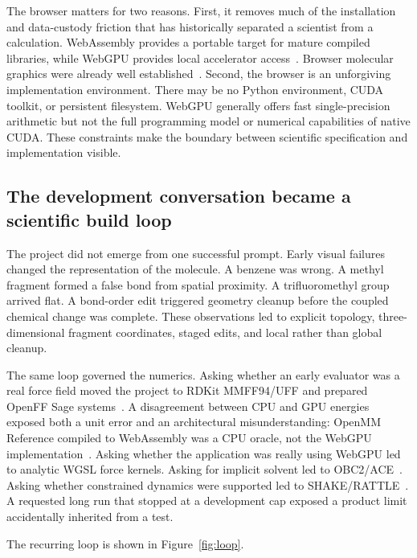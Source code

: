 \documentclass[11pt]{article}
\begin{document}
The browser matters for two reasons.
First, it removes much of the installation and data-custody friction that has historically separated a scientist from a calculation.
WebAssembly provides a portable target for mature compiled libraries, while WebGPU provides local accelerator access~\cite{haas2017wasm,w3c2025webgpu}.
Browser molecular graphics were already well established~\cite{rose2015ngl}.
Second, the browser is an unforgiving implementation environment.
There may be no Python environment, CUDA toolkit, or persistent filesystem.
WebGPU generally offers fast single-precision arithmetic but not the full programming model or numerical capabilities of native CUDA.
These constraints make the boundary between scientific specification and implementation visible.

\subsection{The development conversation became a scientific build loop}
\label{sec:loop}

The project did not emerge from one successful prompt.
Early visual failures changed the representation of the molecule.
A benzene was wrong.
A methyl fragment formed a false bond from spatial proximity.
A trifluoromethyl group arrived flat.
A bond-order edit triggered geometry cleanup before the coupled chemical change was complete.
These observations led to explicit topology, three-dimensional fragment coordinates, staged edits, and local rather than global cleanup.

The same loop governed the numerics.
Asking whether an early evaluator was a real force field moved the project to RDKit MMFF94/UFF and prepared OpenFF Sage systems~\cite{landrum2025rdkit,riniker2015etkdg,halgren1996mmff94,rappe1992uff,boothroyd2023sage}.
A disagreement between CPU and GPU energies exposed both a unit error and an architectural misunderstanding: OpenMM Reference compiled to WebAssembly was a CPU oracle, not the WebGPU implementation~\cite{eastman2024openmm8}.
Asking whether the application was really using WebGPU led to analytic WGSL force kernels.
Asking for implicit solvent led to OBC2/ACE~\cite{onufriev2004obc,schaefer1996ace}.
Asking whether constrained dynamics were supported led to SHAKE/RATTLE~\cite{ryckaert1977shake,andersen1983rattle}.
A requested long run that stopped at a development cap exposed a product limit accidentally inherited from a test.

The recurring loop is shown in Figure~\ref{fig:loop}.
\end{document}
